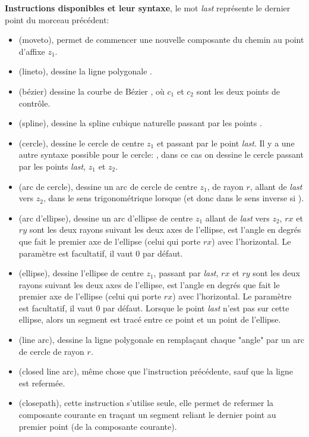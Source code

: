 \noindent\textbf{Instructions disponibles et leur syntaxe}, le mot \emph{last} représente le dernier point du morceau précédent:
      \begin{itemize}
      \item {} (moveto), permet de commencer une nouvelle composante du chemin au point d'affixe $z_1$.
      \item {} (lineto), dessine la ligne polygonale .
      \item {} (bézier) dessine la courbe de Bézier , où $c_1$ et $c_2$ sont les deux points de contrôle.
      \item {} (spline), dessine la spline cubique naturelle passant par les points .
      \item {} (cercle), dessine le cercle de centre $z_1$ et passant par le point \emph{last}. Il y a une autre syntaxe possible pour le cercle: , dans ce cas on dessine le cercle passant par les points \emph{last}, $z_1$ et $z_2$.
      \item {} (arc de cercle), dessine un arc de cercle de centre $z_1$, de rayon $r$, allant de \emph{last} vers $z_2$, dans le sens trigonométrique lorsque  (et donc dans le sens inverse si ).
      \item {} (arc d'ellipse), dessine un arc d'ellipse de centre $z_1$ allant de \emph{last} vers $z_2$, $rx$ et $ry$ sont les deux rayons suivant les deux axes de l'ellipse,  est l'angle en degrés que fait le premier axe de l'ellipse (celui qui porte $rx$) avec l'horizontal. Le paramètre  est facultatif, il vaut $0$ par défaut.
      \item {} (ellipse), dessine l'ellipse de centre $z_1$, passant par \emph{last}, $rx$ et $ry$ sont les deux rayons suivant les deux axes de l'ellipse,  est l'angle en degrés que fait le premier axe de l'ellipse (celui qui porte $rx$) avec l'horizontal. Le paramètre  est facultatif, il vaut $0$ par défaut. Lorsque le point \emph{last} n'est pas sur cette ellipse, alors un segment est tracé entre ce point et un point de l'ellipse.
      \item {} (line arc), dessine la ligne polygonale  en remplaçant chaque "angle" par un arc de cercle de rayon $r$.
      \item {} (closed line arc), même chose que l'instruction précédente, sauf que la ligne est refermée. 
      \item {} (closepath), cette instruction s'utilise seule, elle permet de refermer la composante courante en traçant un segment reliant le dernier point au premier point (de la composante courante).
      \end{itemize}
      
